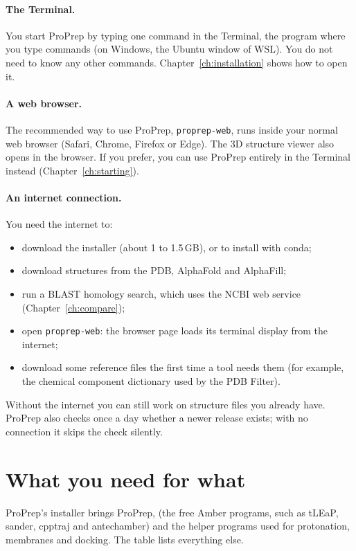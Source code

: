 \paragraph{The Terminal.} You start ProPrep by typing one command in the
Terminal, the program where you type commands (on Windows, the Ubuntu
window of WSL). You do not need to know any other commands. Chapter~\ref{ch:installation}
shows how to open it.

\paragraph{A web browser.} The recommended way to use ProPrep,
\texttt{proprep-web}, runs inside your normal web browser (Safari, Chrome,
Firefox or Edge). The 3D structure viewer also opens in the browser. If you
prefer, you can use ProPrep entirely in the Terminal instead
(Chapter~\ref{ch:starting}).

\paragraph{An internet connection.} You need the internet to:
\begin{itemize}
  \item download the installer (about 1 to 1.5\,GB), or to install with conda;
  \item download structures from the PDB, AlphaFold and AlphaFill;
  \item run a BLAST homology search, which uses the NCBI web service
        (Chapter~\ref{ch:compare});
  \item open \texttt{proprep-web}: the browser page loads its terminal
        display from the internet;
  \item download some reference files the first time a tool needs them (for
        example, the chemical component dictionary used by the PDB Filter).
\end{itemize}
Without the internet you can still work on structure files you already have.
ProPrep also checks once a day whether a newer release exists; with no
connection it skips the check silently.

\section{What you need for what}
\label{sec:requirements-what}

ProPrep's installer brings ProPrep,  (the free Amber
programs, such as tLEaP, sander, cpptraj and antechamber) and the helper
programs used for protonation, membranes and docking. The table lists
everything else.

